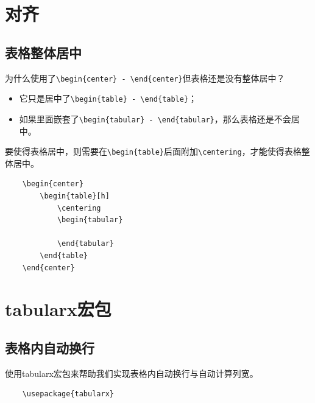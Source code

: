 \section{对齐}
\subsection{表格整体居中}

为什么使用了\verb|\begin{center} - \end{center}|但表格还是没有整体居中？

\begin{itemize}
  \item 它只是居中了\verb|\begin{table} - \end{table}|；
  \item 如果里面嵌套了\verb|\begin{tabular} - \end{tabular}|，那么表格还是不会居中。
\end{itemize}

要使得表格居中，则需要在\verb|\begin{table}|后面附加\verb|\centering|，才能使得表格整体居中。

\begin{lstlisting}
    \begin{center}
        \begin{table}[h]
            \centering
            \begin{tabular}

            \end{tabular}
        \end{table}
    \end{center}
\end{lstlisting}

\section{tabularx宏包}

\subsection{表格内自动换行}

使用tabularx宏包来帮助我们实现表格内自动换行与自动计算列宽。

\begin{lstlisting}
    \usepackage{tabularx}
\end{lstlisting}

